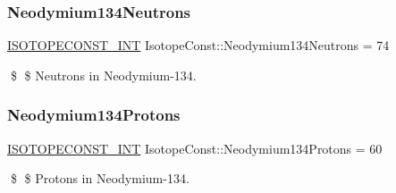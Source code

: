 \subsubsection{\texorpdfstring{Neodymium134\+Neutrons}{Neodymium134Neutrons}}
{\footnotesize\ttfamily \mbox{\hyperlink{group___isotope_const-_macros_ga5f18360b3e99483a35c32d789e62621c}{I\+S\+O\+T\+O\+P\+E\+C\+O\+N\+S\+T\+\_\+\+I\+NT}} Isotope\+Const\+::\+Neodymium134\+Neutrons = 74}

\$ \$ Neutrons in Neodymium-\/134. \mbox{\label{group___isotope_const-_neodymium-_nd134_ga0065b1d752e59a684aabcd875ca4a01d}} 
\subsubsection{\texorpdfstring{Neodymium134\+Protons}{Neodymium134Protons}}
{\footnotesize\ttfamily \mbox{\hyperlink{group___isotope_const-_macros_ga5f18360b3e99483a35c32d789e62621c}{I\+S\+O\+T\+O\+P\+E\+C\+O\+N\+S\+T\+\_\+\+I\+NT}} Isotope\+Const\+::\+Neodymium134\+Protons = 60}

\$ \$ Protons in Neodymium-\/134. 